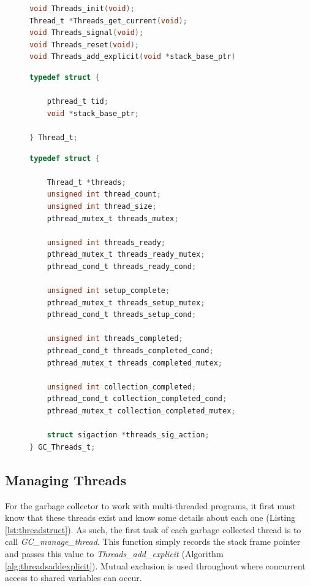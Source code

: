\documentclass[../diss.tex]{subfiles}
\begin{document}
\begin{figure}
\begin{lstlisting}[language=C, caption=The Threads interface, label={lst:threadsinterface}]
void Threads_init(void);
Thread_t *Threads_get_current(void);
void Threads_signal(void);
void Threads_reset(void);
void Threads_add_explicit(void *stack_base_ptr)
\end{lstlisting}
\end{figure}

\begin{figure}
\begin{lstlisting}[language=C, caption=The Thread\_t structure, label={lst:threadstruct}]
typedef struct {

    pthread_t tid;
    void *stack_base_ptr;

} Thread_t;
\end{lstlisting}

\begin{lstlisting}[language=C, caption=The GC\_Threads\_t structure, label={lst:gcthreadsstruct}]
typedef struct {

    Thread_t *threads;
    unsigned int thread_count;
    unsigned int thread_size;
    pthread_mutex_t threads_mutex;

    unsigned int threads_ready;
    pthread_mutex_t threads_ready_mutex;
    pthread_cond_t threads_ready_cond;

    unsigned int setup_complete;
    pthread_mutex_t threads_setup_mutex;
    pthread_cond_t threads_setup_cond;

    unsigned int threads_completed;
    pthread_cond_t threads_completed_cond;
    pthread_mutex_t threads_completed_mutex;

    unsigned int collection_completed;
    pthread_cond_t collection_completed_cond;
    pthread_mutex_t collection_completed_mutex;

    struct sigaction *threads_sig_action;
} GC_Threads_t;
\end{lstlisting}
\end{figure}

\subsection{Managing Threads} \label{sec:threadsmanaging}

For the garbage collector to work with multi-threaded programs, it first must know that these threads exist and know some details about each one (Listing \ref{lst:threadstruct}). As such, the first task of each garbage collected thread is to call \emph{GC\_manage\_thread}. This function simply records the stack frame pointer and passes this value to \emph{Threads\_add\_explicit} (Algorithm \ref{alg:threadsaddexplicit}). Mutual exclusion is used throughout where concurrent access to shared variables can occur.
\end{document}
